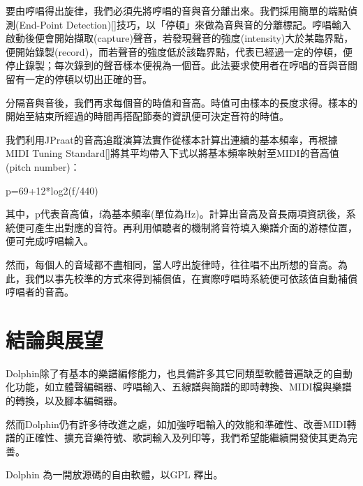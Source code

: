 \documentclass[12pt,a4paper,oneside]{report}
\begin{document}
要由哼唱得出旋律，我們必須先將哼唱的音與音分離出來。我們採用簡單的端點偵測(End-Point Detection)[]技巧，以「停頓」來做為音與音的分離標記。哼唱輸入啟動後便會開始擷取(capture)聲音，若發現聲音的強度(intensity)大於某臨界點，便開始錄製(record)，而若聲音的強度低於該臨界點，代表已經過一定的停頓，便停止錄製；每次錄到的聲音樣本便視為一個音。此法要求使用者在哼唱的音與音間留有一定的停頓以切出正確的音。

分隔音與音後，我們再求每個音的時值和音高。時值可由樣本的長度求得。樣本的開始至結束所經過的時間再搭配節奏的資訊便可決定音符的時值。

我們利用JPraat的音高追蹤演算法實作從樣本計算出連續的基本頻率，再根據MIDI Tuning Standard[]將其平均帶入下式以將基本頻率映射至MIDI的音高值(pitch number)：

p=69+12*log2(f/440)

其中，p代表音高值，f為基本頻率(單位為Hz)。計算出音高及音長兩項資訊後，系統便可產生出對應的音符。再利用傾聽者的機制將音符填入樂譜介面的游標位置，便可完成哼唱輸入。

然而，每個人的音域都不盡相同，當人哼出旋律時，往往唱不出所想的音高。為此，我們以事先校準的方式來得到補償值，在實際哼唱時系統便可依該值自動補償哼唱者的音高。

\chapter{結論與展望}

Dolphin除了有基本的樂譜編修能力，也具備許多其它同類型軟體普遍缺乏的自動化功能，如立體聲編輯器、哼唱輸入、五線譜與簡譜的即時轉換、MIDI檔與樂譜的轉換，以及腳本編輯器。

然而Dolphin仍有許多待改進之處，如加強哼唱輸入的效能和準確性、改善MIDI轉譜的正確性、擴充音樂符號、歌詞輸入及列印等，我們希望能繼續開發使其更為完善。

Dolphin 為一開放源碼的自由軟體，以GPL 釋出。
\end{document}
